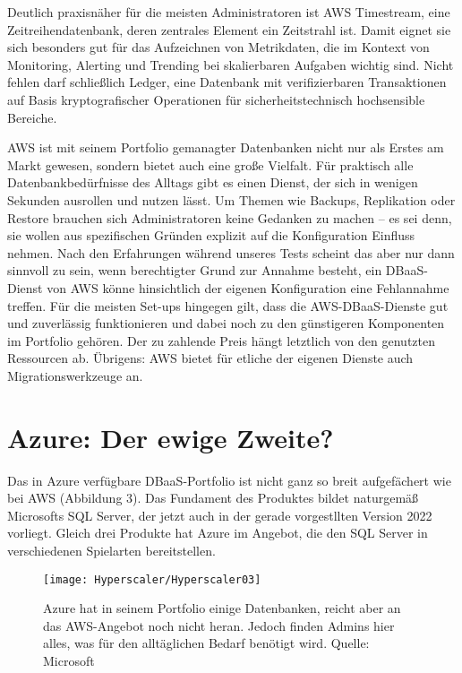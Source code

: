 Deutlich praxisnäher für die meisten Administratoren ist AWS Timestream, eine Zeitreihendatenbank, deren zentrales Element ein Zeitstrahl ist. Damit eignet sie sich besonders gut für das Aufzeichnen von Metrikdaten, die im Kontext von Monitoring, Alerting und Trending bei skalierbaren Aufgaben wichtig sind. Nicht fehlen darf schließlich Ledger, eine Datenbank mit verifizierbaren Transaktionen auf Basis kryptografischer Operationen für sicherheitstechnisch hochsensible Bereiche.

AWS ist mit seinem Portfolio gemanagter Datenbanken nicht nur als Erstes am Markt gewesen, sondern bietet auch eine große Vielfalt. Für praktisch alle Datenbankbedürfnisse des Alltags gibt es einen Dienst, der sich in wenigen Sekunden ausrollen und nutzen lässt. Um Themen wie Backups, Replikation oder Restore brauchen sich Administratoren keine Gedanken zu machen – es sei denn, sie wollen aus spezifischen Gründen explizit auf die Konfiguration Einfluss nehmen. Nach den Erfahrungen während unseres Tests scheint das aber nur dann sinnvoll zu sein, wenn berechtigter Grund zur Annahme besteht, ein DBaaS-Dienst von AWS könne hinsichtlich der eigenen Konfiguration eine Fehlannahme treffen. Für die meisten Set-ups hingegen gilt, dass die AWS-DBaaS-Dienste gut und zuverlässig funktionieren und dabei noch zu den günstigeren Komponenten im Portfolio gehören. Der zu zahlende Preis hängt letztlich von den genutzten Ressourcen ab. Übrigens: AWS bietet für etliche der eigenen Dienste auch Migrationswerkzeuge an.

\section{Azure: Der ewige Zweite?}

Das in Azure verfügbare DBaaS-Portfolio ist nicht ganz so breit aufgefächert wie bei AWS (Abbildung 3). Das Fundament des Produktes bildet naturgemäß Microsofts SQL Server, der jetzt auch in der gerade vorgestllten Version 2022 vorliegt. Gleich drei Produkte hat Azure im Angebot, die den SQL Server in verschiedenen Spielarten bereitstellen.

\begin{figure}
	
	\begin{center}
		
		\texttt{[image: Hyperscaler/Hyperscaler03]}
		
		\caption[Azure]{Azure hat in seinem Portfolio einige Datenbanken, reicht aber an das AWS-Angebot noch nicht heran. Jedoch finden Admins hier alles, was für den alltäglichen Bedarf benötigt wird. Quelle: Microsoft}
	\end{center} 
\end{figure}


